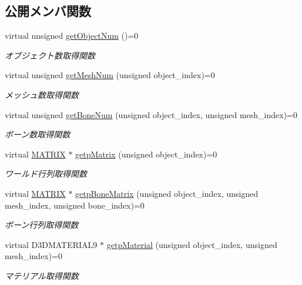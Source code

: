 \subsection*{公開メンバ関数}
\begin{DoxyCompactItemize}
\item 
virtual unsigned \mbox{\hyperlink{class_draw_base_a57c010b4386dc09afa124fba81a6e0fc}{get\+Object\+Num}} ()=0
\begin{DoxyCompactList}\small\item\em オブジェクト数取得関数 \end{DoxyCompactList}\item 
virtual unsigned \mbox{\hyperlink{class_draw_base_add488139aed539e7ccd19492702b4bee}{get\+Mesh\+Num}} (unsigned object\+\_\+index)=0
\begin{DoxyCompactList}\small\item\em メッシュ数取得関数 \end{DoxyCompactList}\item 
virtual unsigned \mbox{\hyperlink{class_draw_base_a9420d7257415446e8cddd1a22f139dd3}{get\+Bone\+Num}} (unsigned object\+\_\+index, unsigned mesh\+\_\+index)=0
\begin{DoxyCompactList}\small\item\em ボーン数取得関数 \end{DoxyCompactList}\item 
virtual \mbox{\hyperlink{_matrix_8h_a032295cd9fb1b711757c90667278e744}{M\+A\+T\+R\+IX}} $\ast$ \mbox{\hyperlink{class_draw_base_a60fc3148b2679e4ea7723d2af0c37283}{getp\+Matrix}} (unsigned object\+\_\+index)=0
\begin{DoxyCompactList}\small\item\em ワールド行列取得関数 \end{DoxyCompactList}\item 
virtual \mbox{\hyperlink{_matrix_8h_a032295cd9fb1b711757c90667278e744}{M\+A\+T\+R\+IX}} $\ast$ \mbox{\hyperlink{class_draw_base_aea44fcf0b1281ec4caa7ad3f2f898950}{getp\+Bone\+Matrix}} (unsigned object\+\_\+index, unsigned mesh\+\_\+index, unsigned bone\+\_\+index)=0
\begin{DoxyCompactList}\small\item\em ボーン行列取得関数 \end{DoxyCompactList}\item 
virtual D3\+D\+M\+A\+T\+E\+R\+I\+A\+L9 $\ast$ \mbox{\hyperlink{class_draw_base_a940543b482e934624637f3c6b4d17f96}{getp\+Material}} (unsigned object\+\_\+index, unsigned mesh\+\_\+index)=0
\begin{DoxyCompactList}\small\item\em マテリアル取得関数 \end{DoxyCompactList}\item 

\end{DoxyCompactItemize}
